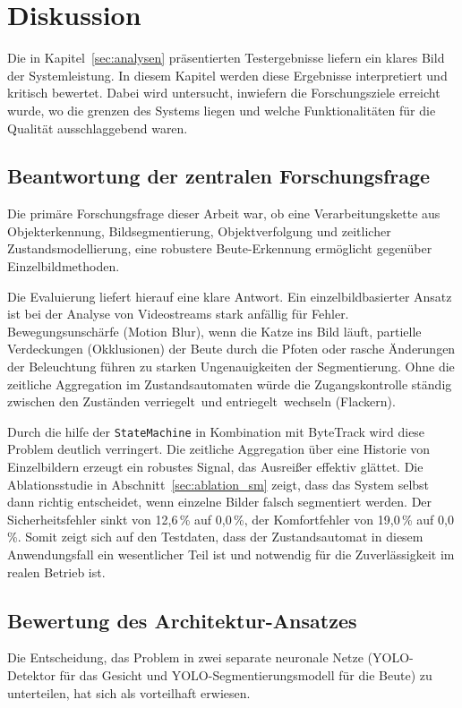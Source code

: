 \chapter{Diskussion}
\label{sec:diskussion}

Die in Kapitel~\ref{sec:analysen} präsentierten Testergebnisse liefern ein klares Bild der Systemleistung. In diesem Kapitel werden diese Ergebnisse interpretiert und kritisch bewertet. Dabei wird untersucht, inwiefern die Forschungsziele erreicht wurde, wo die grenzen des Systems liegen und welche Funktionalitäten für die Qualität ausschlaggebend waren.

\section{Beantwortung der zentralen Forschungsfrage}
Die primäre Forschungsfrage dieser Arbeit war, ob eine Verarbeitungskette aus Objekterkennung, Bildsegmentierung, Objektverfolgung und zeitlicher Zustandsmodellierung, eine robustere Beute-Erkennung ermöglicht gegenüber Einzelbildmethoden.

Die Evaluierung liefert hierauf eine klare Antwort. Ein einzelbildbasierter Ansatz ist bei der Analyse von Videostreams stark anfällig für Fehler. Bewegungsunschärfe (Motion Blur), wenn die Katze ins Bild läuft, partielle Verdeckungen (Okklusionen) der Beute durch die Pfoten oder rasche Änderungen der Beleuchtung führen zu starken Ungenauigkeiten der Segmentierung. Ohne die zeitliche Aggregation im Zustandsautomaten würde die Zugangskontrolle ständig zwischen den Zuständen \glqq verriegelt\grqq\ und \glqq entriegelt\grqq\ wechseln (Flackern).

Durch die hilfe der \texttt{StateMachine} in Kombination mit ByteTrack wird diese Problem deutlich verringert. Die zeitliche Aggregation über eine Historie von Einzelbildern erzeugt ein robustes Signal, das Ausreißer effektiv glättet. Die Ablationsstudie in Abschnitt~\ref{sec:ablation_sm} zeigt, dass das System selbst dann richtig entscheidet, wenn einzelne Bilder falsch segmentiert werden. Der Sicherheitsfehler sinkt von 12,6\,\% auf 0,0\,\%, der Komfortfehler von 19,0\,\% auf 0,0\,\%. Somit zeigt sich auf den Testdaten, dass der Zustandsautomat in diesem Anwendungsfall ein wesentlicher Teil ist und notwendig für die Zuverlässigkeit im realen Betrieb ist.

\section{Bewertung des Architektur-Ansatzes}
Die Entscheidung, das Problem in zwei separate neuronale Netze (YOLO-Detektor für das Gesicht und YOLO-Segmentierungsmodell für die Beute) zu unterteilen, hat sich als vorteilhaft erwiesen.

